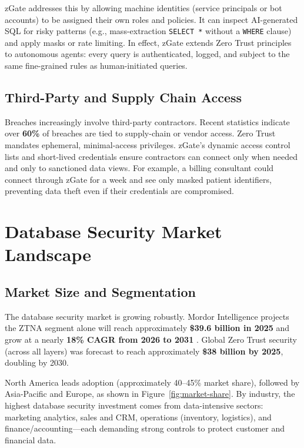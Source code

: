 zGate addresses this by allowing machine identities (service principals or bot accounts) to be assigned their own roles and policies. It can inspect AI-generated SQL for risky patterns (e.g., mass-extraction \texttt{SELECT *} without a \texttt{WHERE} clause) and apply masks or rate limiting. In effect, zGate extends Zero Trust principles to autonomous agents: every query is authenticated, logged, and subject to the same fine-grained rules as human-initiated queries.

\subsection{Third-Party and Supply Chain Access}

Breaches increasingly involve third-party contractors. Recent statistics indicate over \textbf{60\%} of breaches are tied to supply-chain or vendor access. Zero Trust mandates ephemeral, minimal-access privileges. zGate's dynamic access control lists and short-lived credentials ensure contractors can connect only when needed and only to sanctioned data views. For example, a billing consultant could connect through zGate for a week and see only masked patient identifiers, preventing data theft even if their credentials are compromised.

\section{Database Security Market Landscape}

\subsection{Market Size and Segmentation}

The database security market is growing robustly. Mordor Intelligence projects the ZTNA segment alone will reach approximately \textbf{\$39.6 billion in 2025} and grow at a nearly \textbf{18\% CAGR from 2026 to 2031} \cite{mordor2026ztna}. Global Zero Trust security (across all layers) was forecast to reach approximately \textbf{\$38 billion by 2025}, doubling by 2030.

North America leads adoption (approximately 40--45\% market share), followed by Asia-Pacific and Europe, as shown in Figure~\ref{fig:market-share}. By industry, the highest database security investment comes from data-intensive sectors: marketing analytics, sales and CRM, operations (inventory, logistics), and finance/accounting---each demanding strong controls to protect customer and financial data.

